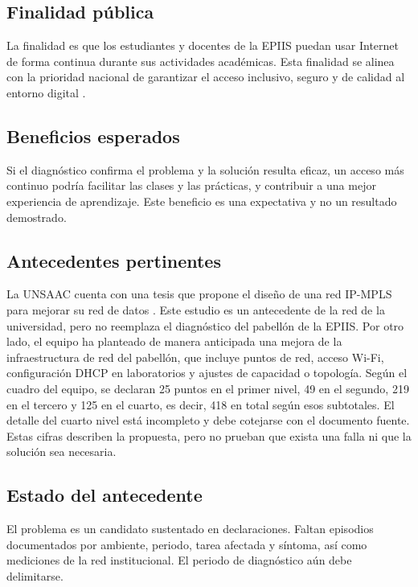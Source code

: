 \subsection{Finalidad pública}

	La finalidad es que los estudiantes y docentes de la EPIIS puedan usar Internet de forma continua durante sus actividades académicas. Esta finalidad se alinea con la prioridad nacional de garantizar el acceso inclusivo, seguro y de calidad al entorno digital \cite{pcm2023}.

\subsection{Beneficios esperados}

	Si el diagnóstico confirma el problema y la solución resulta eficaz, un acceso más continuo podría facilitar las clases y las prácticas, y contribuir a una mejor experiencia de aprendizaje. Este beneficio es una expectativa y no un resultado demostrado.

\subsection{Antecedentes pertinentes}

	La UNSAAC cuenta con una tesis que propone el diseño de una red IP-MPLS para mejorar su red de datos \cite{tesisipmpls}. Este estudio es un antecedente de la red de la universidad, pero no reemplaza el diagnóstico del pabellón de la EPIIS. Por otro lado, el equipo ha planteado de manera anticipada una mejora de la infraestructura de red del pabellón, que incluye puntos de red, acceso Wi-Fi, configuración DHCP en laboratorios y ajustes de capacidad o topología. Según el cuadro del equipo, se declaran 25 puntos en el primer nivel, 49 en el segundo, 219 en el tercero y 125 en el cuarto, es decir, 418 en total según esos subtotales. El detalle del cuarto nivel está incompleto y debe cotejarse con el documento fuente. Estas cifras describen la propuesta, pero no prueban que exista una falla ni que la solución sea necesaria.

\subsection{Estado del antecedente}

	El problema es un candidato sustentado en declaraciones. Faltan episodios documentados por ambiente, periodo, tarea afectada y síntoma, así como mediciones de la red institucional. El periodo de diagnóstico aún debe delimitarse.
